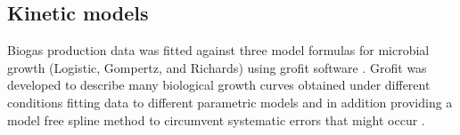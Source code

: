 \subsection{Kinetic models}
Biogas production data was fitted against three model formulas for microbial growth (Logistic, Gompertz, and Richards) using grofit software \cite{Kahm_2010}. Grofit  was developed to describe many biological growth curves obtained under different conditions fitting data to different parametric models and in addition providing a model free spline method to circumvent systematic errors that might
occur \cite{Kahm_2010}.
